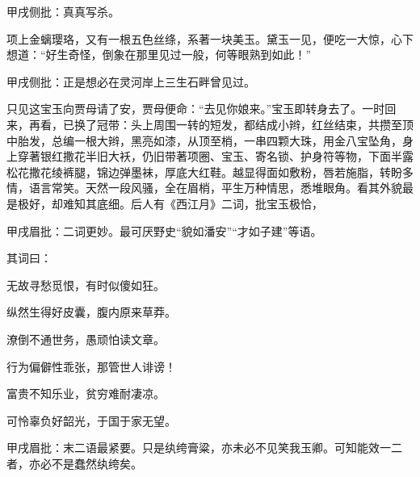\begin{parag}
    \begin{note}甲戌侧批：真真写杀。\end{note}项上金螭璎珞，又有一根五色丝绦，系著一块美玉。黛玉一见，便吃一大惊，心下想道：“好生奇怪，倒象在那里见过一般，何等眼熟到如此！”\begin{note}甲戌侧批：正是想必在灵河岸上三生石畔曾见过。\end{note}只见这宝玉向贾母请了安，贾母便命：“去见你娘来。”宝玉即转身去了。一时回来，再看，已换了冠带：头上周围一转的短发，都结成小辫，红丝结束，共攒至顶中胎发，总编一根大辫，黑亮如漆，从顶至梢，一串四颗大珠，用金八宝坠角，身上穿著银红撒花半旧大袄，仍旧带著项圈、宝玉、寄名锁、护身符等物，下面半露松花撒花绫裤腿，锦边弹墨袜，厚底大红鞋。越显得面如敷粉，唇若施脂，转盼多情，语言常笑。天然一段风骚，全在眉梢，平生万种情思，悉堆眼角。看其外貌最是极好，却难知其底细。后人有《西江月》二词，批宝玉极恰，\begin{note}甲戌眉批：二词更妙。最可厌野史“貌如潘安”“才如子建”等语。\end{note}其词曰：
\end{parag}
\begin{poem}
    \begin{pl} 无故寻愁觅恨，有时似傻如狂。\end{pl}

    \begin{pl} 纵然生得好皮囊，腹内原来草莽。\end{pl}

    \begin{pl} 潦倒不通世务，愚顽怕读文章。\end{pl}

    \begin{pl} 行为偏僻性乖张，那管世人诽谤！\end{pl}

    \emptypl

    \begin{pl} 富贵不知乐业，贫穷难耐凄凉。\end{pl}

    \begin{pl} 可怜辜负好韶光，于国于家无望。\end{pl}

    \begin{note}甲戌眉批：末二语最紧要。只是纨绔膏粱，亦未必不见笑我玉卿。可知能效一二者，亦必不是蠢然纨绔矣。\end{note}
\end{poem}


